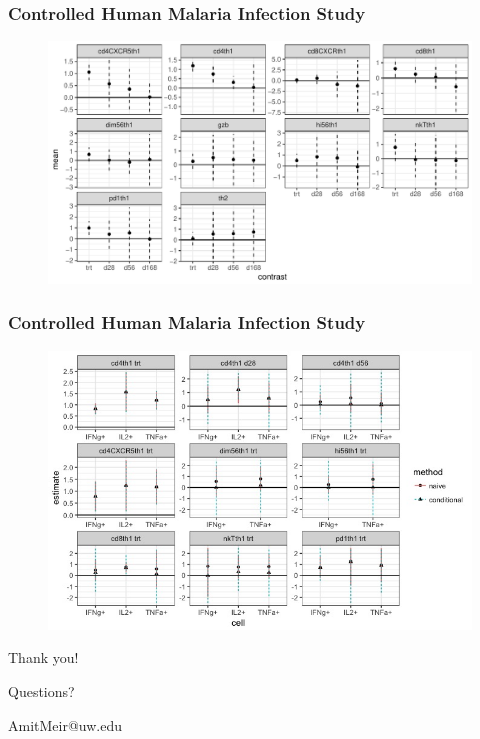 \documentclass{beamer}
\theoremstyle{definition}
\begin{document}
\begin{frame}
\frametitle{Controlled Human Malaria Infection Study}
\begin{figure}[]
\includegraphics[width=10 cm]{figures/malariaAggregates} 
\end{figure}
\end{frame}


\begin{frame}
\frametitle{Controlled Human Malaria Infection Study}
\begin{figure}[]
\includegraphics[width=10 cm]{figures/malariapost} \end{figure}
\end{frame}


\begin{frame}
\begin{center}
\huge{Thank you!}

\vspace{2 cm}
\LARGE{Questions?}

\vspace{1cm}
\large{AmitMeir@uw.edu}
\end{center}
\end{frame}
\end{document}
